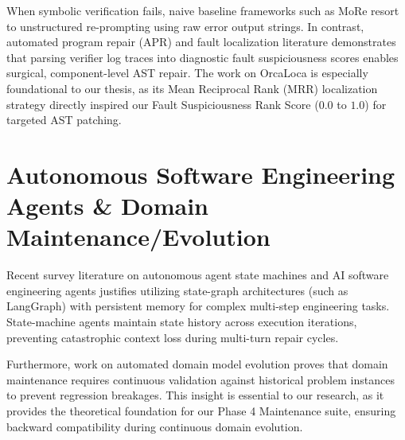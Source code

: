 \documentclass[11pt,a4paper]{report}
\begin{document}
When symbolic verification fails, naive baseline frameworks such as MoRe \cite{more2024} resort to unstructured re-prompting using raw error output strings. In contrast, automated program repair (APR) and fault localization literature \cite{autostructor2024, orcaloca2024} demonstrates that parsing verifier log traces into diagnostic fault suspiciousness scores enables surgical, component-level AST repair. The work on OrcaLoca \cite{orcaloca2024} is especially foundational to our thesis, as its Mean Reciprocal Rank (MRR) localization strategy directly inspired our Fault Suspiciousness Rank Score ($0.0$ to $1.0$) for targeted AST patching.

\section{Autonomous Software Engineering Agents \& Domain Maintenance/Evolution}
Recent survey literature on autonomous agent state machines \cite{wang2024} and AI software engineering agents \cite{chen2021} justifies utilizing state-graph architectures (such as LangGraph) with persistent memory for complex multi-step engineering tasks. State-machine agents maintain state history across execution iterations, preventing catastrophic context loss during multi-turn repair cycles.

Furthermore, work on automated domain model evolution \cite{plan2evolve2024} proves that domain maintenance requires continuous validation against historical problem instances to prevent regression breakages. This insight is essential to our research, as it provides the theoretical foundation for our Phase 4 Maintenance suite, ensuring backward compatibility during continuous domain evolution.
\end{document}

